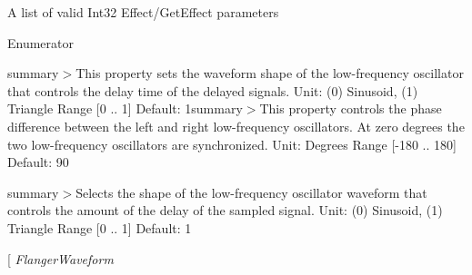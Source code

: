 A list of valid Int32 Effect/\-Get\-Effect parameters

\begin{Desc}
\item[Enumerator]\par
\begin{description}
\item[{\em 
\hypertarget{namespace_open_t_k_1_1_audio_1_1_open_a_l_a49039c1ddcb53675576ad2780fc50315a0438189b004fb8b751cca7afe9e0f2d1}{Chorus\-Waveform}\label{namespace_open_t_k_1_1_audio_1_1_open_a_l_a49039c1ddcb53675576ad2780fc50315a0438189b004fb8b751cca7afe9e0f2d1}
}]summary$>$This property sets the waveform shape of the low-\/frequency oscillator that controls the delay time of the delayed signals. Unit\-: (0) Sinusoid, (1) Triangle Range \mbox{[}0 .. 1\mbox{]} Default\-: 1summary$>$This property controls the phase difference between the left and right low-\/frequency oscillators. At zero degrees the two low-\/frequency oscillators are synchronized. Unit\-: Degrees Range \mbox{[}-\/180 .. 180\mbox{]} Default\-: 90\item[{\em 
\hypertarget{namespace_open_t_k_1_1_audio_1_1_open_a_l_a49039c1ddcb53675576ad2780fc50315a77d4a7a7be689cbe3f3637f75442106a}{Chorus\-Phase}\label{namespace_open_t_k_1_1_audio_1_1_open_a_l_a49039c1ddcb53675576ad2780fc50315a77d4a7a7be689cbe3f3637f75442106a}
}]summary$>$Selects the shape of the low-\/frequency oscillator waveform that controls the amount of the delay of the sampled signal. Unit\-: (0) Sinusoid, (1) Triangle Range \mbox{[}0 .. 1\mbox{]} Default\-: 1\item[{\em 
\hypertarget{namespace_open_t_k_1_1_audio_1_1_open_a_l_a49039c1ddcb53675576ad2780fc50315a675fde11a59a472add88615a716e8be3}{Flanger\-Waveform}\label{namespace_open_t_k_1_1_audio_1_1_open_a_l_a49039c1ddcb53675576ad2780fc50315a675fde11a59a472add88615a716e8be3}
}
\end{description}
\end{Desc}
